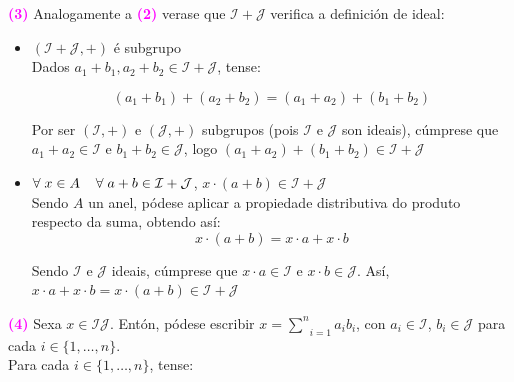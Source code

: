 \documentclass[twoside]{report}
\newcommand{\magbf}[1]{\textcolor{magenta}{\textbf{#1}}} %
\theoremstyle{mystyle}
\begin{document}
\noindent \magbf{(3)} Analogamente a \magbf{(2)} verase que $\mathcal{I + J}$ verifica a definición de ideal:

\begin{itemize}
    \item $(\mathcal{I + J}, +)$ é subgrupo\\
    
    Dados $a_{1} + b_{1}, a_{2} + b_{2} \in \mathcal{I + J}$, tense:
    
    $$(a_{1} + b_{1}) + (a_{2} + b_{2}) = (a_{1} + a_{2}) + (b_{1} + b_{2})$$
    
    Por ser $(\mathcal{I}, +)$ e $(\mathcal{J}, +)$ subgrupos (pois $\mathcal{I}$ e $\mathcal{J}$ son ideais), cúmprese que $a_{1} + a_{2} \in \mathcal{I}$ e $b_{1} + b_{2} \in \mathcal{J}$, logo $(a_{1} + a_{2}) + (b_{1} + b_{2}) \in \mathcal{I + J}$\\
    
    \item $\forall \hspace{1mm} x \in A \hspace{4mm} \forall \hspace{1mm} a + b \in \mathcal{I + J}$, \hspace{2mm} $x \cdot (a + b) \in \mathcal{I + J}$\\
    
    Sendo $A$ un anel, pódese aplicar a propiedade distributiva do produto respecto da suma, obtendo así:
    $$x \cdot (a + b) = x \cdot a + x \cdot b$$
    
    Sendo $\mathcal{I}$ e $\mathcal{J}$ ideais, cúmprese que $x \cdot a \in \mathcal{I}$ e $x \cdot b \in \mathcal{J}$. Así, $x \cdot a + x \cdot b = x \cdot (a + b) \in \mathcal{I + J}$ \\
    
\end{itemize}

\noindent \magbf{(4)} Sexa $x \in \mathcal{IJ}$. Entón, pódese escribir $x = \underset{i = 1}{\overset{n}{\sum}}a_{i}b_{i}$, con $a_{i} \in \mathcal{I}$, $b_{i} \in \mathcal{J}$ para cada $i \in \{1, \dots , n\}$.\\

\noindent Para cada $i \in \{1, \dots, n\}$, tense:
\end{document}
